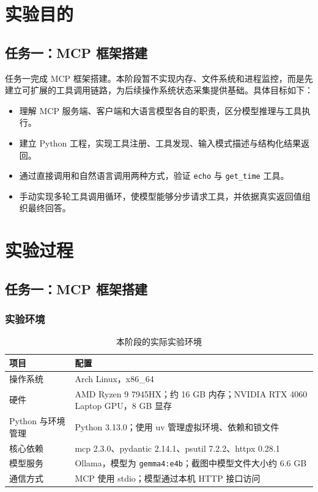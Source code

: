 \documentclass[12pt,a4paper]{ctexart}
\title{\reporttitle}
\author{\authname：\underline{\hspace{2cm}}\quad
\authid：\underline{\hspace{2.5cm}}\quad
\class：\underline{\hspace{2cm}}}
\date{2026年10月25日}
\newcommand{\subtask}{任务一：MCP 框架搭建}
\begin{document}
\maketitle
\tableofcontents
\newpage

\section{实验目的}
\subsection{\subtask}
任务一完成 MCP 框架搭建。本阶段暂不实现内存、文件系统和进程监控，而是先建立可扩展的工具调用链路，为后续操作系统状态采集提供基础。具体目标如下：
\begin{itemize}
  \item 理解 MCP 服务端、客户端和大语言模型各自的职责，区分模型推理与工具执行。
  \item 建立 Python 工程，实现工具注册、工具发现、输入模式描述与结构化结果返回。
  \item 通过直接调用和自然语言调用两种方式，验证 \texttt{echo} 与 \texttt{get\_time} 工具。
  \item 手动实现多轮工具调用循环，使模型能够分步请求工具，并依据真实返回值组织最终回答。
\end{itemize}

\section{实验过程}
\subsection{\subtask}
\subsubsection{实验环境}
\begin{table}[H]
\centering
\caption{本阶段的实际实验环境}
\begin{tabular}{lp{10.8cm}}
\toprule
项目 & 配置 \\
\midrule
操作系统 & Arch Linux，x86\_64 \\
硬件 & AMD Ryzen 9 7945HX；约 16 GB 内存；NVIDIA RTX 4060 Laptop GPU，8 GB 显存 \\
Python 与环境管理 & Python 3.13.0；使用 uv 管理虚拟环境、依赖和锁文件 \\
核心依赖 & mcp 2.3.0、pydantic 2.14.1、psutil 7.2.2、httpx 0.28.1 \\
模型服务 & Ollama，模型为 \texttt{gemma4:e4b}；截图中模型文件大小约 6.6 GB \\
通信方式 & MCP 使用 stdio；模型通过本机 HTTP 接口访问 \\
\bottomrule
\end{tabular}
\end{table}
\end{document}
